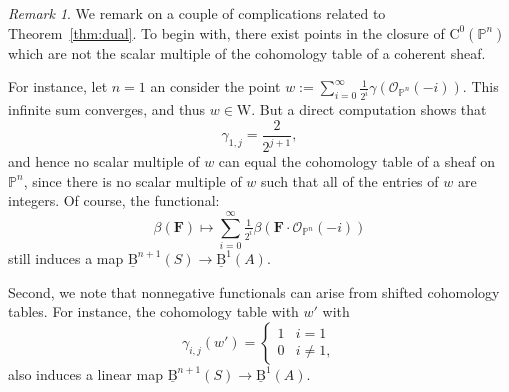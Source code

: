 \documentclass[12pt]{amsart}
\theoremstyle{definition}
\theoremstyle{remark}
\newtheorem{remark}[lemma]{Remark}
\newcommand{\PP}{\mathbb{P}}
\newcommand{\WW}{\mathrm{W}}
\newcommand{\cO}{\mathcal{O}}
\newcommand{\FF}{\mathbf{F}}
\newcommand{\CQ}{\mathrm{C}}
\newcommand{\BBQ}{\underline{\mathrm{B}}}
\begin{document}
\begin{remark}\label{rmk:issues}
We remark on a couple of complications related to Theorem~\ref{thm:dual}.  To begin with, there exist points in the closure of $\CQ^0(\PP^n)$ which are not the scalar multiple of the cohomology table of a coherent sheaf.   

For instance, let $n=1$ an consider the point $w:=\sum_{i=0}^\infty \frac{1}{2^i} \gamma(\cO_{\PP^n}(-i))$.  
This infinite sum converges, and thus $w\in \WW$.  But a direct computation shows that
\[
\gamma_{1,j}=\frac{2}{2^{j+1}},
\]
and hence no scalar multiple of $w$ can equal the cohomology table of a sheaf on $\PP^n$, since there is no scalar multiple of $w$ such that all of the entries of $w$ are integers.  Of course, the functional:
\[
\beta(\FF)\mapsto \sum_{i=0}^\infty \tfrac{1}{2^i} \beta(\FF\cdot \cO_{\PP^n}(-i))
\]
still induces a map $\BBQ^{n+1}(S)\to \BBQ^1(A)$.

Second, we note that nonnegative functionals can arise from shifted cohomology tables.  For instance, the cohomology table with $w'$ with 
\[
\gamma_{i,j}(w')=\begin{cases}
1&i=1\\
0&i\ne 1,
\end{cases}
\]
also induces a linear map $\BBQ^{n+1}(S)\to \BBQ^1(A)$.
\end{remark}
\end{document}
